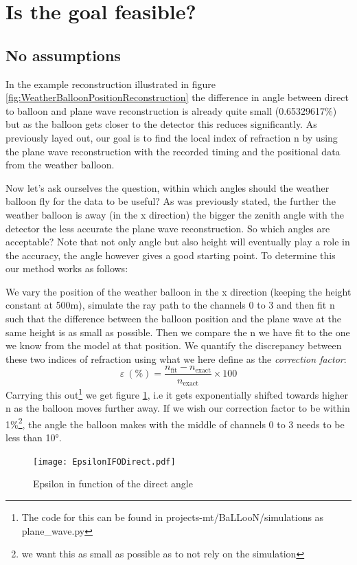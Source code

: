 \section{Is the goal feasible?}
\subsection{No assumptions}
In the example reconstruction illustrated in figure
\ref{fig:WeatherBalloonPositionReconstruction} the difference in angle between
direct to balloon and plane wave reconstruction is already quite small
(0.65329617\%) but as the balloon gets closer to the detector this reduces
significantly. As previously layed out, our goal is to find the local index of refraction n by using the
plane wave reconstruction with the recorded timing and the positional data from
the weather balloon.

Now let's ask ourselves the question, within which angles should the
weather balloon fly for the data to be useful?  As was previously stated, the
further the weather balloon is away (in the x direction) the bigger the zenith
angle with the detector the less accurate the plane wave reconstruction.  So
which angles are acceptable? Note that not only angle but also height will eventually
play a role in the accuracy, the angle however gives a good starting point.
To determine this our method works as follows: 

We vary the position of the weather balloon in the x direction (keeping the
height constant at 500m), simulate the ray path to the channels 0 to 3 and then fit n
such that the difference between the balloon position and the plane wave at the same
height is as small as possible.  Then we compare the n we have fit to the
one we know from the model at that position.  We quantify the discrepancy
between these two indices of refraction using what we here define as the
\textit{correction factor}:
\begin{equation}
  \varepsilon\ (\%) = \frac{n_\text{fit} - n_{\text{exact}}}{n_{\text{exact}}} \times 100
\end{equation}
Carrying this out\footnote{The code for this can be found in
projects-mt/BaLLooN/simulations as plane\_wave.py} we get figure
\ref{fig:EpsilonIFODirect}, i.e it gets exponentially shifted towards higher n
as the balloon moves further away. If we wish our correction factor to be
within 1\%\footnote{we want this as small as possible as to not rely on the
simulation}, the angle the balloon makes with the middle of channels 0 to 3
needs to be less than 10°.
\begin{figure}
	\centering
	\texttt{[image: EpsilonIFODirect.pdf]}
	\caption{Epsilon in function of the direct angle}
	\label{fig:EpsilonIFODirect}
\end{figure}

